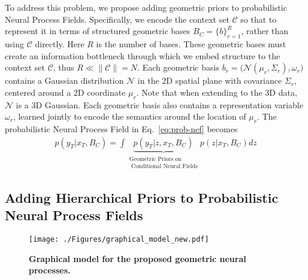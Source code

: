 To address this problem, we propose adding geometric priors to probabilistic Neural Process Fields.
Specifically, we encode the context set $\mathcal{C}$ so that to represent it in terms of structured geometric bases $B_C = \big\{b \big\}_{r=1}^{R}$, rather than using $\mathcal{C}$ directly. Here $R$ is the number of bases. 
These geometric bases must create an information bottleneck through which we embed structure to the context set $\mathcal{C}$, thus $R \ll \|\mathcal{C}\| = N$.
Each geometric basis $b_r= \Big( \mathcal{N}(\mu_r, \Sigma_r), \omega_r\Big)$ contains a Gaussian distribution $\mathcal{N}$ in the 2D spatial plane with covariance $\Sigma_r$, centered around a 2D coordinate $\mu_r$. Note that when extending to the 3D data, $\mathcal{N}$ is a 3D Gaussian. 
Each geometric basis also contains a representation variable $\omega_r$, learned jointly to encode the semantics around the location of $\mu_r$.
The probabilistic Neural Process Field in Eq.~\eqref{eq:prob-nef} becomes
%
\begin{align}
p(y_T | x_T, B_C) = \int \underbrace{p(y_T | z, x_T, B_C)}_{\substack{\text{Geometric Priors on} \\ \text{ Conditional Neural Fields}}} p(z | x_T, B_C) d z
\label{eq:prob-nef-geom}
\end{align}
%





\subsection{Adding Hierarchical Priors to Probabilistic Neural Process Fields}

\begin{figure}[t]
\centering
\texttt{[image: ./Figures/graphical\_model\_new.pdf]} 
\caption{\textbf{Graphical model for the proposed geometric neural processes.}}
\label{fig: graphical_model}
\end{figure}


